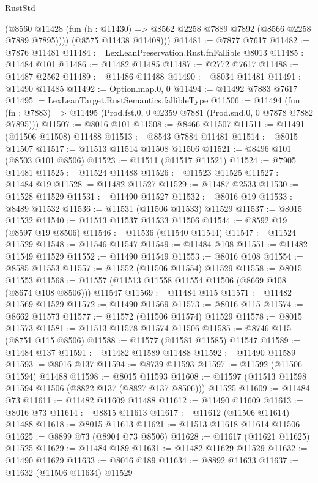 \begin{lexlean}{RustStd}
\begin{coremodule}
          (@8560 @11428 (fun (h : @11430) => @8562 @2258 @7889 @7892 (@8566 @2258 @7889 @7895))))
        (@8575 @11438 @11408)))
@11481 := @7877 @7617
@11482 := @7876 @11481
@11484 := LexLeanPreservation.Rust.fnFallible @8013
@11485 := @11484 @101
@11486 := @11482 @11485
@11487 := @2772 @7617
@11488 := @11487 @2562
@11489 := @11486 @11488
@11490 := @8034 @11481
@11491 := @11490 @11485
@11492 := Option.map.{0, 0}
@11494 := @11492 @7883 @7617
@11495 := LexLeanTarget.RustSemantics.fallibleType
@11506 := @11494
    (fun (fn : @7883) => @11495 (Prod.fst.{0, 0} @2359 @7881 (Prod.snd.{0, 0} @7878 @7882 @7895)))
@11507 := @8016 @101
@11508 := @8466 @11507
@11511 := @11491 (@11506 @11508) @11488
@11513 := @8543 @7884 @11481
@11514 := @8015 @11507
@11517 := @11513 @11514 @11508 @11506
@11521 := @8496 @101 (@8503 @101 @8506)
@11523 := @11511 (@11517 @11521)
@11524 := @7905 @11481
@11525 := @11524 @11488
@11526 := @11523 @11525
@11527 := @11484 @19
@11528 := @11482 @11527
@11529 := @11487 @2533
@11530 := @11528 @11529
@11531 := @11490 @11527
@11532 := @8016 @19
@11533 := @8489 @11532
@11536 := @11531 (@11506 @11533) @11529
@11537 := @8015 @11532
@11540 := @11513 @11537 @11533 @11506
@11544 := @8592 @19 (@8597 @19 @8506)
@11546 := @11536 (@11540 @11544)
@11547 := @11524 @11529
@11548 := @11546 @11547
@11549 := @11484 @108
@11551 := @11482 @11549 @11529
@11552 := @11490 @11549
@11553 := @8016 @108
@11554 := @8585 @11553
@11557 := @11552 (@11506 @11554) @11529
@11558 := @8015 @11553
@11568 := @11557 (@11513 @11558 @11554 @11506 (@8669 @108 (@8674 @108 @8506))) @11547
@11569 := @11484 @115
@11571 := @11482 @11569 @11529
@11572 := @11490 @11569
@11573 := @8016 @115
@11574 := @8662 @11573
@11577 := @11572 (@11506 @11574) @11529
@11578 := @8015 @11573
@11581 := @11513 @11578 @11574 @11506
@11585 := @8746 @115 (@8751 @115 @8506)
@11588 := @11577 (@11581 @11585) @11547
@11589 := @11484 @137
@11591 := @11482 @11589 @11488
@11592 := @11490 @11589
@11593 := @8016 @137
@11594 := @8739 @11593
@11597 := @11592 (@11506 @11594) @11488
@11598 := @8015 @11593
@11608 := @11597 (@11513 @11598 @11594 @11506 (@8822 @137 (@8827 @137 @8506))) @11525
@11609 := @11484 @73
@11611 := @11482 @11609 @11488
@11612 := @11490 @11609
@11613 := @8016 @73
@11614 := @8815 @11613
@11617 := @11612 (@11506 @11614) @11488
@11618 := @8015 @11613
@11621 := @11513 @11618 @11614 @11506
@11625 := @8899 @73 (@8904 @73 @8506)
@11628 := @11617 (@11621 @11625) @11525
@11629 := @11484 @189
@11631 := @11482 @11629 @11529
@11632 := @11490 @11629
@11633 := @8016 @189
@11634 := @8892 @11633
@11637 := @11632 (@11506 @11634) @11529

\end{coremodule}
\end{lexlean}
